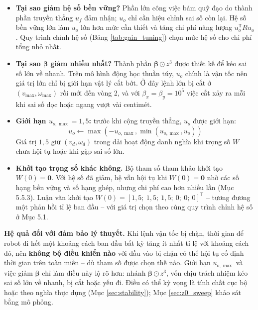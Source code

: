 \documentclass[12pt,a4paper]{article}
\newcommand{\T}{\mathsf{T}}
\begin{document}
\begin{itemize}
    \item \textbf{Tại sao giảm hệ số bền vững?} Phần lớn công việc bám quỹ đạo do thành phần truyền thẳng $u_f$ đảm nhận; $u_o$ chỉ cần hiệu chỉnh sai số còn lại. Hệ số bền vững lớn làm $u_o$ lớn hơn mức cần thiết và tăng chi phí năng lượng $u_o^\T R u_o$. Quy trình chỉnh hệ số (Bảng \ref{tab:gain_tuning}) chọn mức hệ số cho chi phí tổng nhỏ nhất.

    \item \textbf{Tại sao $\bm{\beta}$ giảm nhiều nhất?} Thành phần $\bm{\beta} \odot z^3$ được thiết kế để kéo sai số lớn về nhanh. Trên mô hình động học thuần túy, $u_o$ chính là vận tốc nên giá trị lớn chỉ bị giới hạn vật lý cắt bớt. Ở đây lệnh lớn bị cắt ở $(v_{\max}, \omega_{\max})$ rồi mới đến vòng 2, và với $\beta_x = \beta_y = 10^5$ việc cắt xảy ra mỗi khi sai số dọc hoặc ngang vượt vài centimét.

    \item \textbf{Giới hạn $u_{o,\max} = 1{,}5$:} trước khi cộng truyền thẳng, $u_o$ được giới hạn:
    \begin{equation}\label{eq:clamp}
        u_o \leftarrow \max(-u_{o,\max}, \min(u_{o,\max}, u_o))
    \end{equation}
    Giá trị $1{,}5$ giữ $(v_d, \omega_d)$ trong dải hoạt động danh nghĩa khi trọng số $W$ chưa hội tụ hoặc khi gặp sai số lớn.

    \item \textbf{Khởi tạo trọng số khác không.} Bộ tham số tham khảo khởi tạo $W(0) = \bm{0}$. Với hệ số đã giảm, hệ vẫn hội tụ khi $W(0) = \bm{0}$ nhờ các số hạng bền vững và số hạng ghép, nhưng chi phí cao hơn nhiều lần (Mục 5.5.3). Luận văn khởi tạo $W(0) = [1{,}5;\ 1{,}5;\ 1{,}5;\ 0;\ 0;\ 0]^\T$ -- tương đương một phản hồi tỉ lệ ban đầu -- với giá trị chọn theo cùng quy trình chỉnh hệ số ở Mục 5.1.
\end{itemize}

\textbf{Hệ quả đối với đảm bảo lý thuyết.} Khi lệnh vận tốc bị chặn, thời gian để robot đi hết một khoảng cách ban đầu bất kỳ tăng ít nhất tỉ lệ với khoảng cách đó, nên \textbf{không bộ điều khiển nào} với đầu vào bị chặn có thể hội tụ cố định thời gian trên toàn miền -- dù tham số được chọn thế nào. Giới hạn $u_{o,\max}$ và việc giảm $\bm\beta$ chỉ làm điều này lộ rõ hơn: nhánh $\bm\beta\odot z^3$, vốn chịu trách nhiệm kéo sai số lớn về nhanh, bị cắt hoặc yếu đi. Điều có thể kỳ vọng là tính chất cục bộ hoặc theo nghĩa thực dụng (Mục \ref{sec:stability}); Mục \ref{sec:z0_sweep} khảo sát bằng mô phỏng.
\end{document}
